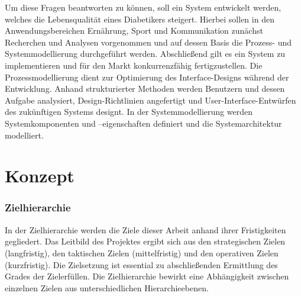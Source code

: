 \documentclass[a4paper,11pt]{article}%
\renewcommand{\\}{\vspace*{0.5\baselineskip} \newline}
\begin{document}
Um diese Fragen beantworten zu können, soll ein System entwickelt werden, welches die Lebensqualität eines Diabetikers steigert. 
Hierbei sollen in den Anwendungsbereichen \glqq Ernährung\grqq{}, \glqq Sport\grqq{} und \glqq Kommunikation\grqq{} zunächst Recherchen und Analysen vorgenommen 
und auf dessen Basis die Prozess- und Systemmodellierung durchgeführt werden. Abschließend gilt es ein System zu implementieren und für den Markt konkurrenzfähig fertigzustellen. 
Die Prozessmodellierung dient zur Optimierung des Interface-Designs während der Entwicklung. Anhand strukturierter Methoden werden Benutzern und dessen Aufgabe analysiert, Design-Richtlinien angefertigt und 
User-Interface-Entwürfen des zukünftigen Systems designt. In der Systemmodellierung werden Systemkomponenten und –eigenschaften definiert und die
Systemarchitektur modelliert.


\newpage
\vspace*{\fill}
\part{Konzept}
\vfill
\newpage
\section{Zielhierarchie}
In der Zielhierarchie werden die Ziele dieser Arbeit anhand ihrer Fristigkeiten gegliedert. Das Leitbild des Projektes ergibt sich aus den strategischen Zielen (langfristig), den taktischen Zielen (mittelfristig) und den operativen Zielen (kurzfristig). Die Zielsetzung ist essential zu abschließenden Ermittlung des Grades der Zielerfüllen. Die Zielhierarchie bewirkt eine Abhängigkeit zwischen einzelnen Zielen aus unterschiedlichen Hierarchieebenen.
\end{document}
